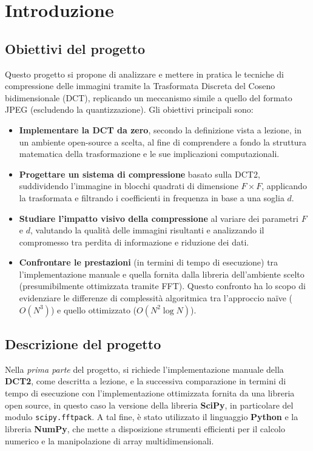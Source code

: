 \section{Introduzione}

\subsection{Obiettivi del progetto}
Questo progetto si propone di analizzare e mettere in pratica le tecniche di compressione delle immagini tramite la Trasformata Discreta del Coseno bidimensionale (DCT), replicando un meccanismo simile a quello del formato JPEG (escludendo la quantizzazione). Gli obiettivi principali sono:

\begin{itemize}
    \item \textbf{Implementare la DCT da zero}, secondo la definizione vista a lezione, in un ambiente open-source a scelta, al fine di comprendere a fondo la struttura matematica della trasformazione e le sue implicazioni computazionali.

    \item \textbf{Progettare un sistema di compressione} basato sulla DCT2, suddividendo l’immagine in blocchi quadrati di dimensione \( F \times F \), applicando la trasformata e filtrando i coefficienti in frequenza in base a una soglia \( d \).
      
    \item \textbf{Studiare l’impatto visivo della compressione} al variare dei parametri \( F \) e \( d \), valutando la qualità delle immagini risultanti e analizzando il compromesso tra perdita di informazione e riduzione dei dati.
    
    \item \textbf{Confrontare le prestazioni} (in termini di tempo di esecuzione) tra l’implementazione manuale e quella fornita dalla libreria dell’ambiente scelto (presumibilmente ottimizzata tramite FFT). Questo confronto ha lo scopo di evidenziare le differenze di complessità algoritmica tra l’approccio naïve (\( O(N^3) \)) e quello ottimizzato (\( O(N^2 \log N) \)).

\end{itemize}

\subsection{Descrizione del progetto}
 Nella \textit{prima parte} del progetto, si richiede l'implementazione manuale della \textbf{DCT2}, come descritta a lezione, e la successiva comparazione in termini di tempo di esecuzione con l'implementazione ottimizzata fornita da una libreria open source, in questo caso la versione della libreria \textbf{SciPy}, in particolare del modulo \texttt{scipy.fftpack}. A tal fine, è stato utilizzato il linguaggio \textbf{Python} e la libreria \textbf{NumPy}, che mette a disposizione strumenti efficienti per il calcolo numerico e la manipolazione di array multidimensionali.\\

